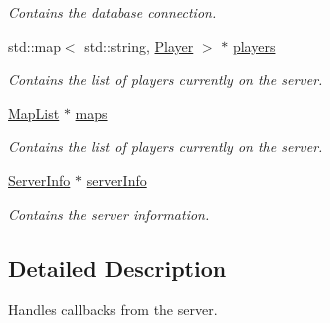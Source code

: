 \begin{DoxyCompactItemize}
\begin{DoxyCompactList}\small\item\em Contains the database connection. \end{DoxyCompactList}\item 
\hypertarget{classCallBackManager_a26e135142b37e3b02b72aa7a091ef854}{std\-::map$<$ std\-::string, \hyperlink{structPlayer}{Player} $>$ $\ast$ \hyperlink{classCallBackManager_a26e135142b37e3b02b72aa7a091ef854}{players}}\label{classCallBackManager_a26e135142b37e3b02b72aa7a091ef854}

\begin{DoxyCompactList}\small\item\em Contains the list of players currently on the server. \end{DoxyCompactList}\item 
\hypertarget{classCallBackManager_a4b3c557fca85e1ba8ab292fc9df3da7c}{\hyperlink{classMapList}{Map\-List} $\ast$ \hyperlink{classCallBackManager_a4b3c557fca85e1ba8ab292fc9df3da7c}{maps}}\label{classCallBackManager_a4b3c557fca85e1ba8ab292fc9df3da7c}

\begin{DoxyCompactList}\small\item\em Contains the list of players currently on the server. \end{DoxyCompactList}\item 
\hypertarget{classCallBackManager_aed9d56d611bfcbc282f6c99f5b8408a2}{\hyperlink{structServerInfo}{Server\-Info} $\ast$ \hyperlink{classCallBackManager_aed9d56d611bfcbc282f6c99f5b8408a2}{server\-Info}}\label{classCallBackManager_aed9d56d611bfcbc282f6c99f5b8408a2}

\begin{DoxyCompactList}\small\item\em Contains the server information. \end{DoxyCompactList}\end{DoxyCompactItemize}


\subsection{Detailed Description}
Handles callbacks from the server. 

